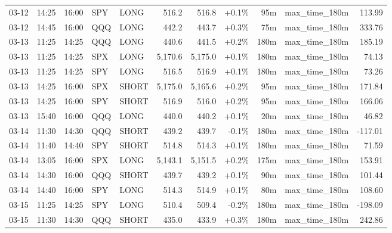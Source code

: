 \documentclass[11pt,a4paper,twoside]{article}
\begin{document}
\begin{center}
\begin{longtable}{>{\color{txtmain}}l l l l l r r r r >{\color{txtmain}}l r}
03-12 & 14:25 & 16:00 & SPY & LONG & 516.2 & 516.8 & \textcolor{wingreen}{+0.1\%} & 95m & max\_time\_180m & \textcolor{wingreen}{113.99} \\
03-12 & 14:45 & 16:00 & QQQ & LONG & 442.2 & 443.7 & \textcolor{wingreen}{+0.3\%} & 75m & max\_time\_180m & \textcolor{wingreen}{333.76} \\
03-13 & 11:25 & 14:25 & QQQ & LONG & 440.6 & 441.5 & \textcolor{wingreen}{+0.2\%} & 180m & max\_time\_180m & \textcolor{wingreen}{185.19} \\
03-13 & 11:25 & 14:25 & SPX & LONG & 5,170.6 & 5,175.0 & \textcolor{wingreen}{+0.1\%} & 180m & max\_time\_180m & \textcolor{wingreen}{74.13} \\
03-13 & 11:25 & 14:25 & SPY & LONG & 516.5 & 516.9 & \textcolor{wingreen}{+0.1\%} & 180m & max\_time\_180m & \textcolor{wingreen}{73.26} \\
03-13 & 14:25 & 16:00 & SPX & SHORT & 5,175.0 & 5,165.6 & \textcolor{wingreen}{+0.2\%} & 95m & max\_time\_180m & \textcolor{wingreen}{171.84} \\
03-13 & 14:25 & 16:00 & SPY & SHORT & 516.9 & 516.0 & \textcolor{wingreen}{+0.2\%} & 95m & max\_time\_180m & \textcolor{wingreen}{166.06} \\
03-13 & 15:40 & 16:00 & QQQ & LONG & 440.0 & 440.2 & \textcolor{wingreen}{+0.1\%} & 20m & max\_time\_180m & \textcolor{wingreen}{46.82} \\
03-14 & 11:30 & 14:30 & QQQ & SHORT & 439.2 & 439.7 & \textcolor{lossred}{-0.1\%} & 180m & max\_time\_180m & \textcolor{lossred}{-117.01} \\
03-14 & 11:40 & 14:40 & SPY & SHORT & 514.8 & 514.3 & \textcolor{wingreen}{+0.1\%} & 180m & max\_time\_180m & \textcolor{wingreen}{71.59} \\
03-14 & 13:05 & 16:00 & SPX & LONG & 5,143.1 & 5,151.5 & \textcolor{wingreen}{+0.2\%} & 175m & max\_time\_180m & \textcolor{wingreen}{153.91} \\
03-14 & 14:30 & 16:00 & QQQ & SHORT & 439.7 & 439.2 & \textcolor{wingreen}{+0.1\%} & 90m & max\_time\_180m & \textcolor{wingreen}{101.44} \\
03-14 & 14:40 & 16:00 & SPY & LONG & 514.3 & 514.9 & \textcolor{wingreen}{+0.1\%} & 80m & max\_time\_180m & \textcolor{wingreen}{108.60} \\
03-15 & 11:25 & 14:25 & SPY & LONG & 510.4 & 509.4 & \textcolor{lossred}{-0.2\%} & 180m & max\_time\_180m & \textcolor{lossred}{-198.09} \\
03-15 & 11:30 & 14:30 & QQQ & SHORT & 435.0 & 433.9 & \textcolor{wingreen}{+0.3\%} & 180m & max\_time\_180m & \textcolor{wingreen}{242.86} \\

\end{longtable}
\end{center}
\end{document}
